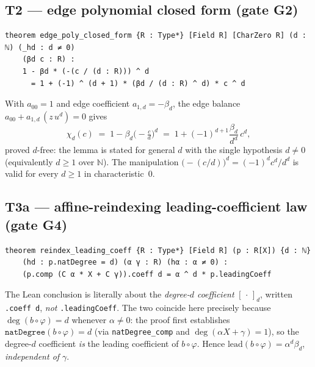 \documentclass[11pt]{article}
\begin{document}
\subsection*{T2 --- edge polynomial closed form (gate G2)}
\begin{lstlisting}
theorem edge_poly_closed_form {R : Type*} [Field R] [CharZero R] (d : ℕ) (_hd : d ≠ 0)
    (βd c : R) :
    1 - βd * (-(c / (d : R))) ^ d
      = 1 + (-1) ^ (d + 1) * (βd / (d : R) ^ d) * c ^ d
\end{lstlisting}
With $a_{00}=1$ and edge coefficient $a_{1,d}=-\beta_d$, the edge balance
$a_{00}+a_{1,d}\,(z\,u^{d})=0$ gives
\[
  \chi_d(c)\;=\;1-\beta_d\bigl(-\tfrac{c}{d}\bigr)^{d}
  \;=\;1+(-1)^{d+1}\frac{\beta_d}{d^{d}}\,c^{d},
\]
proved $d$-free: the lemma is stated for general $d$ with the single hypothesis
$d\neq 0$ (equivalently $d\ge 1$ over $\mathbb{N}$). The manipulation
$\bigl(-(c/d)\bigr)^{d}=(-1)^{d}c^{d}/d^{d}$ is valid for every $d\ge1$ in
characteristic~$0$.

\subsection*{T3a --- affine-reindexing leading-coefficient law (gate G4)}
\begin{lstlisting}
theorem reindex_leading_coeff {R : Type*} [Field R] (p : R[X]) {d : ℕ}
    (hd : p.natDegree = d) (α γ : R) (hα : α ≠ 0) :
    (p.comp (C α * X + C γ)).coeff d = α ^ d * p.leadingCoeff
\end{lstlisting}
The Lean conclusion is literally about the \emph{degree-$d$ coefficient}
$[\,\cdot\,]_d$, written \texttt{.coeff d}, \emph{not} \texttt{.leadingCoeff}.
The two coincide here precisely because $\deg(b\circ\varphi)=d$ whenever
$\alpha\neq0$: the proof first establishes
$\texttt{natDegree}(b\circ\varphi)=d$ (via \texttt{natDegree\_comp} and
$\deg(\alpha X+\gamma)=1$), so the degree-$d$ coefficient \emph{is} the leading
coefficient of $b\circ\varphi$. Hence
$\mathrm{lead}(b\circ\varphi)=\alpha^{d}\beta_d$, \emph{independent of
$\gamma$}.
\end{document}
